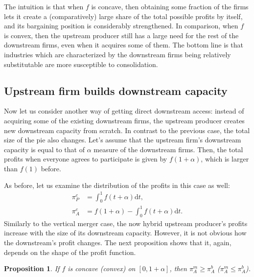 \documentclass[a4paper]{article}
\newtheorem{proposition}{Proposition}
\newcommand{\dt}{\mathrm{d}t}
\begin{document}
The intuition is that when $f$ is concave, then obtaining some fraction of the firms lets it create a (comparatively) large share of the total possible profits by itself, and its bargaining position is considerably strengthened.
In comparison, when $f$ is convex, then the upstream producer still has a large need for the rest of the downstream firms, even when it acquires some of them.
The bottom line is that industries which are characterized by the downstream firms being relatively substitutable are more susceptible to consolidation.

\subsection{Upstream firm builds downstream capacity}

Now let us consider another way of getting direct downstream access: instead of acquiring some of the existing downstream firms, the upstream producer creates new downstream capacity from scratch.
In contrast to the previous case, the total size of the pie also changes.
Let's assume that the upstream firm's downstream capacity is equal to that of $\alpha$ measure of the downstream firms.
Then, the total profits when everyone agrees to participate is given by $f(1 + \alpha)$, which is larger than $f(1)$ before.

As before, let us examine the distribution of the profits in this case as well:
\begin{align*}
    \pi_{P}^c & = \int_0^1 f(t + \alpha) \dt, \\
    \pi_{A}^c & = f(1 + \alpha) - \int_0^1 f(t + \alpha) \dt .
\end{align*}
Similarly to the vertical merger case, the now hybrid upstream producer's profits increase with the size of its downstream capacity.
However, it is not obvious how the downstream's profit changes.
The next proposition shows that it, again, depends on the shape of the profit function.
\begin{proposition}
    \label{prop:downstream_capacity}
    If $f$ is concave (convex) on $[0, 1+\alpha]$, then $\pi_A^m \geq \pi_A^b$ ($\pi_A^m \leq \pi_A^b$). 
\end{proposition}
\end{document}
